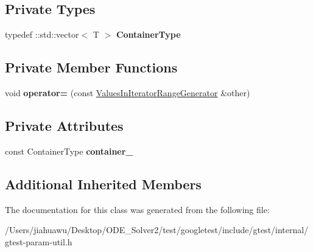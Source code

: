 \subsection*{Private Types}
\begin{DoxyCompactItemize}
\item 
\mbox{\label{classtesting_1_1internal_1_1_values_in_iterator_range_generator_afab6b799a125b471a8784ced9cf7335c}} 
typedef \+::std\+::vector$<$ T $>$ {\bfseries Container\+Type}
\end{DoxyCompactItemize}
\subsection*{Private Member Functions}
\begin{DoxyCompactItemize}
\item 
\mbox{\label{classtesting_1_1internal_1_1_values_in_iterator_range_generator_ab43e1feff118f5be232ae1b85d539dd1}} 
void {\bfseries operator=} (const \mbox{\hyperlink{classtesting_1_1internal_1_1_values_in_iterator_range_generator}{Values\+In\+Iterator\+Range\+Generator}} \&other)
\end{DoxyCompactItemize}
\subsection*{Private Attributes}
\begin{DoxyCompactItemize}
\item 
\mbox{\label{classtesting_1_1internal_1_1_values_in_iterator_range_generator_ad2701e9149384e64b1b98da5d31eb7a4}} 
const Container\+Type {\bfseries container\+\_\+}
\end{DoxyCompactItemize}
\subsection*{Additional Inherited Members}


The documentation for this class was generated from the following file\+:\begin{DoxyCompactItemize}
\item 
/\+Users/jiahuawu/\+Desktop/\+O\+D\+E\+\_\+\+Solver2/test/googletest/include/gtest/internal/gtest-\/param-\/util.\+h\end{DoxyCompactItemize}
